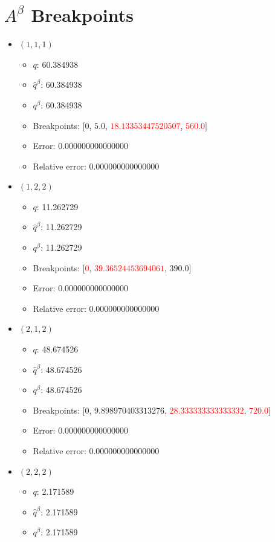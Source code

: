 \documentclass{article}%
\begin{document}
\section{$A^\beta$ Breakpoints}%
\thispagestyle{plain}%
\begin{itemize}%
	\item $(1, 1, 1)$%
	\begin{itemize}%
		\item $q$: 60.384938%
		\item $\hat{q}^\beta$: 60.384938%
		\item $q^\beta$: 60.384938%
		\item Breakpoints: $[$$0$, $5.0$, \textcolor{red}{$18.13353447520507$}, \textcolor{red}{$560.0$}$]$%
		\item Error: 0.000000000000000%
		\item Relative error: 0.000000000000000%
	\end{itemize}%
	\item $(1, 2, 2)$%
	\begin{itemize}%
		\item $q$: 11.262729%
		\item $\hat{q}^\beta$: 11.262729%
		\item $q^\beta$: 11.262729%
		\item Breakpoints: $[$\textcolor{red}{$0$}, \textcolor{red}{$39.36524453694061$}, $390.0$$]$%
		\item Error: 0.000000000000000%
		\item Relative error: 0.000000000000000%
	\end{itemize}%
	\item $(2, 1, 2)$%
	\begin{itemize}%
		\item $q$: 48.674526%
		\item $\hat{q}^\beta$: 48.674526%
		\item $q^\beta$: 48.674526%
		\item Breakpoints: $[$$0$, $9.898970403313276$, \textcolor{red}{$28.333333333333332$}, \textcolor{red}{$720.0$}$]$%
		\item Error: 0.000000000000000%
		\item Relative error: 0.000000000000000%
	\end{itemize}%
	\item $(2, 2, 2)$%
	\begin{itemize}%
		\item $q$: 2.171589%
		\item $\hat{q}^\beta$: 2.171589%
		\item $q^\beta$: 2.171589%

\end{itemize}
\end{itemize}
\end{document}
